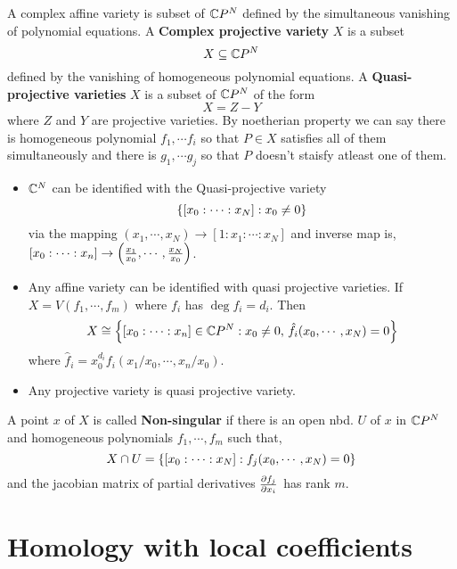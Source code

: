 \documentclass[11pt]{article}
\begin{document}
\vspace*{0.2cm}

\noindent A complex affine variety is subset of $\mathbb{C} P^N$ defined by the simultaneous vanishing of polynomial equations. A \textbf{Complex projective variety} $X$ is a subset $$X \subseteq \mathbb{C} P^N$$ defined by the vanishing of homogeneous polynomial equations. A \textbf{Quasi-projective varieties} $X$ is a subset of $\mathbb{C} P^N$ of the form $$ X = Z - Y$$ where $Z$ and $Y$ are projective varieties. By noetherian property we can say there is homogeneous polynomial $f_1,\cdots f_i$ so that $P \in X$ satisfies all of them simultaneously and there is $g_1,\cdots g_j$ so that $P$ doesn't staisfy atleast one of them.
\begin{itemize}
    \item[]   $\mathbb{C}^N$ can be identified with the Quasi-projective variety $$\qty{[x_0:\cdots:x_N]: x_0 \neq 0}$$ via the mapping $(x_1,\cdots,x_N) \to [1:x_1:\cdots :x_N]$ and inverse map is, $[x_0:\cdots:x_n] \to \qty(\frac{x_1}{x_0},\cdots,\frac{x_N}{x_0})$.
    \item[]  Any affine variety can be identified with quasi projective varieties. If $X = V(f_1,\cdots ,f_m)$ where $f_i$ has $\deg f_i = d_i$. Then $$X \cong \qty{[x_0:\cdots: x_n] \in \mathbb{C}P^N : x_0 \neq 0, \, \hat{f}_i(x_0,\cdots,x_N)=0}$$ where $\hat{f}_i = x_0^{d_i} f_i(x_1/x_0,\cdots,x_n/x_0)$.
    \item[]  Any projective variety is quasi projective variety.
\end{itemize}
A point $x$ of $X$ is called \textbf{Non-singular} if there is an open nbd. $U$ of $x$ in $\mathbb{C} P^N$ and homogeneous polynomials $f_1,\cdots,f_m$ such that, $$X \cap U = \qty{[x_0:\cdots:x_N]:f_j(x_0,\cdots,x_N)=0}$$ and the jacobian matrix of partial derivatives $\pdv{f_j}{x_i}$ has rank $m$.



\pagebreak

\section{Homology with local coefficients}

  \pagebreak

  \printbibliography[ 
        heading=bibintoc,
        title={Bibliography}
    ]
\end{document}
